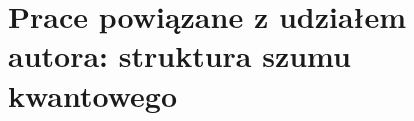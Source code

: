 %

\chapter{Prace powiązane z udziałem autora: struktura szumu kwantowego}\label{chapter:noise_structure}

